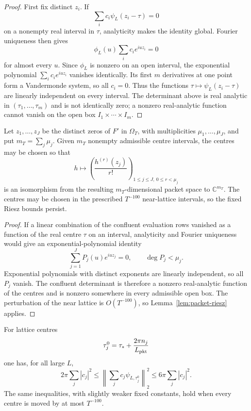 \begin{proof}
First fix distinct $z_i$. If
\[
\sum_i c_i\psi_L(z_i-\tau)=0
\]
on a nonempty real interval in $\tau$, analyticity makes the identity global.
Fourier uniqueness then gives
\[
\phi_L(u)\sum_i c_ie^{iuz_i}=0
\]
for almost every $u$. Since $\phi_L$ is nonzero on an open interval, the
exponential polynomial $\sum_i c_ie^{iuz_i}$ vanishes identically. Its first
$m$ derivatives at one point form a Vandermonde system, so all $c_i=0$.
Thus the functions $\tau\mapsto\psi_L(z_i-\tau)$ are linearly independent on
every interval. The determinant above is real analytic in
$(\tau_1,\dots,\tau_m)$ and is not identically zero; a nonzero real-analytic
function cannot vanish on the open box $I_1\times\cdots\times I_m$.
\end{proof}

\begin{lemma}
\label{lem:hermite-packet-evaluation}
Let $z_1,\dots,z_J$ be the distinct zeros of $F'$ in $\Omega_T$, with
multiplicities $\mu_1,\dots,\mu_J$, and put $m_T=\sum_j\mu_j$.  Given
$m_T$ nonempty admissible centre intervals, the centres may be chosen so that
\begin{equation}
 h\longmapsto
 \left(\frac{h^{(r)}(z_j)}{r!}\right)_{1\le j\le J,\ 0\le r<\mu_j}
\label{eq:hermite-packet-map}
\end{equation}
is an isomorphism from the resulting $m_T$-dimensional packet space to
$\mathbb C^{m_T}$.  The centres may be chosen in the prescribed
$T^{-100}$ near-lattice intervals, so the fixed Riesz bounds persist.
\end{lemma}

\begin{proof}
If a linear combination of the confluent evaluation rows vanished as a
function of the real centre $\tau$ on an interval, analyticity and Fourier
uniqueness would give an exponential-polynomial identity
\[
 \sum_{j=1}^J P_j(u)e^{iuz_j}=0,
 \qquad \deg P_j<\mu_j.
\]
Exponential polynomials with distinct exponents are linearly independent, so
all $P_j$ vanish.  The confluent determinant is therefore a nonzero
real-analytic function of the centres and is nonzero somewhere in every
admissible open box.  The perturbation of the near lattice is $O(T^{-100})$,
so Lemma~\ref{lem:packet-riesz} applies.
\end{proof}

\begin{lemma}
\label{lem:packet-riesz}
For lattice centres
\[
\tau_j^0=\tau_*+\frac{2\pi n_j}{L_{\rm pkt}}
\]
one has, for all large $L$,
\begin{equation}
\boxed{
2\pi\sum_j|c_j|^2
\le\left\|\sum_jc_j\psi_{L,\tau_j^0}\right\|_2^2
\le6\pi\sum_j|c_j|^2.
}
\label{eq:packet-riesz}
\end{equation}
The same inequalities, with slightly weaker fixed constants, hold when every
centre is moved by at most $T^{-100}$.
\end{lemma}

